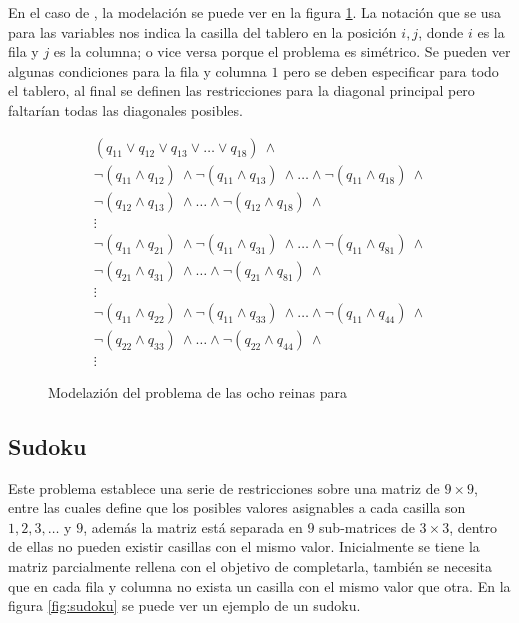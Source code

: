En el caso de \sat, la modelación se puede ver en la figura \ref{fig:queens_sat}. La notación que se usa para las variables nos indica la casilla del tablero en la posición $i,j$, donde $i$ es la fila y $j$ es la columna; o vice versa porque el problema es simétrico. Se pueden ver algunas condiciones para la fila y columna $1$ pero se deben especificar para todo el tablero, al final se definen las restricciones para la diagonal principal pero faltarían todas las diagonales posibles.

\begin{figure}
\begin{align*}
    (q_{11} \lor q_{12} \lor q_{13}\lor\dots\lor q_{18})\ \land\\
    \neg(q_{11} \land q_{12})\ \land\neg(q_{11} \land q_{13})\ \land\dots\land\neg(q_{11} \land q_{18})\ \land\\
    \neg(q_{12} \land q_{13})\ \land\dots\land\neg(q_{12} \land q_{18})\ \land\\
    \vdots\\
    \neg(q_{11} \land q_{21})\ \land\neg(q_{11} \land q_{31})\ \land\dots\land\neg(q_{11} \land q_{81})\ \land\\
    \neg(q_{21} \land q_{31})\ \land\dots\land\neg(q_{21} \land q_{81})\ \land\\
    \vdots\\
    \neg(q_{11} \land q_{22})\ \land\neg(q_{11} \land q_{33})\ \land\dots\land\neg(q_{11} \land q_{44})\ \land\\
    \neg(q_{22} \land q_{33})\ \land\dots\land\neg(q_{22} \land q_{44})\ \land\\
    \vdots
\end{align*}
\caption{Modelazión del problema de las ocho reinas para \sat}
\label{fig:queens_sat}
\end{figure}

\subsection{Sudoku}

Este problema establece una serie de restricciones sobre una matriz de $9\times9$, entre las cuales define que los posibles valores asignables a cada casilla son $1, 2, 3, \dots$ y $9$, además la matriz está separada en $9$ sub-matrices de $3\times 3$, dentro de ellas no pueden existir casillas con el mismo valor. Inicialmente se tiene la matriz parcialmente rellena con el objetivo de completarla, también se necesita que en cada fila y columna no exista un casilla con el mismo valor que otra. En la figura \ref{fig:sudoku} se puede ver un ejemplo de un sudoku.

